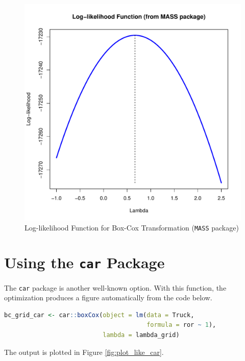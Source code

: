 \documentclass[11pt]{book}
\begin{document}
\begin{figure}[h!]
  \centering
  \includegraphics[scale = 0.5, keepaspectratio=true]{../Figures/plot_like_MASS}
  \caption{Log-likelihood Function for Box-Cox Transformation (\texttt{MASS} package)} \label{fig:plot_like_MASS}
\end{figure}


\clearpage
\section*{Using the \texttt{car} Package}

The \texttt{car} package is another well-known option.
With this function, the optimization produces 
a figure automatically from the code below.

\begin{lstlisting}[language=R]
bc_grid_car <- car::boxCox(object = lm(data = Truck,
                                       formula = ror ~ 1),
                           lambda = lambda_grid)
\end{lstlisting}

The output is plotted in Figure \ref{fig:plot_like_car}.
\end{document}
